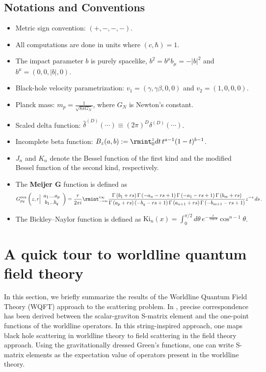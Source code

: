 \subsection*{Notations and Conventions}
\begin{itemize}[leftmargin=1.55em,itemsep=0.42em,topsep=0.45em,label=\textcolor{brandburgundy}{\small\textbullet}]
\item Metric sign convention: $(+,-,-,-)$.
\item All computations are done in units where $(c,\hbar)=1$.
\item The impact parameter $b$ is purely spacelike, $b^2=b^\mu b_\mu=-|b|^2$ and $b^{\mu}=(0,0,|b|,0)$.
\item Black-hole velocity parametrization: $v_1=(\gamma,\gamma\beta,0,0)$ and $v_2=(1,0,0,0)$.
\item Planck mass: $m_p=\frac{1}{\sqrt{8\pi G_N}}$, where $G_N$ is Newton's constant.
\item Scaled delta function: $\hat\delta^{(D)}(\cdots)\equiv (2\pi)^{D}\delta^{(D)}(\cdots)$.
\item Incomplete beta function: $B_{z}(a,b):=\rmint_0^z dt\,t^{a-1}(1-t)^{b-1}$.
\item $J_n$ and $K_n$ denote the Bessel function of the first kind and the modified Bessel function of the second kind, respectively.
\item The \textbf{Meijer G} function is defined as
\begin{align}
    G_{p q}^{m n} \left(z,r\Big|
\begin{array}{c}
 a_1\text{...}.a_p \\
 b_1\text{...} b_q \\
\end{array}\right)
=\frac{r}{2 \pi  i}\rmint_{-i\infty}^{i\infty} \frac{   \Gamma  \left(b_1+r s\right) \Gamma\left(-a_n-r s+1\right) \Gamma  \left(-a_1-r s+1\right) \Gamma\left(b_m+r s\right)}{  \Gamma  \left(a_p+r s\right) \left(-b_q-r s+1\right) \Gamma  \left(a_{n+1}+r s\right) \Gamma  \left(-b_{m+1}-r s+1\right)}z^{-s}\,ds\,.\nonumber
\end{align}
\item The Bickley–Naylor function is defined as $ \textrm{Ki}_{n}(x)=\int_0^{\pi/2}  d\theta\,e^{-\frac{x}{\cos\theta}}\cos^{n-1}\theta$.
\end{itemize}
\section{A quick tour to worldline quantum field theory}\label{ch2:sec2}
In this section, we briefly summarize the results of the Worldline Quantum Field Theory (WQFT) approach to the scattering problem. In \cite{Mogull:2020sak}, precise correspondence has been derived between the scalar-graviton S-matrix element and the one-point functions of the worldline operators. In this string-inspired approach, one maps black hole scattering in worldline theory to field scattering in the field theory approach. Using the gravitationally dressed Green's functions, one can write S-matrix elements as the expectation value of operators present in the worldline theory.

